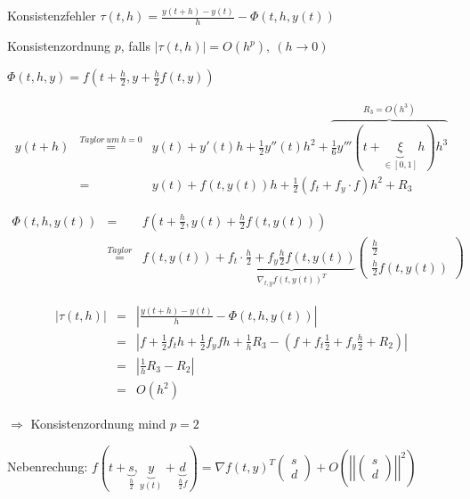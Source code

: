 \documentclass[10pt,a4paper]{article}
\begin{document}
Konsistenzfehler
$\tau(t,h)=\frac{y(t+h)-y(t)}{h} -\Phi(t,h,y(t))$

Konsistenzordnung $p$, falls
$|\tau(t,h)|=O(h^{p}), ~(h \rightarrow 0)$

\begin{bsp}
$\Phi(t,h,y)=f(t+\frac{h}{2},y+\frac{h}{2}f(t,y))$

\begin{eqnarray*}
y(t+h)&\stackrel{Taylor ~ um ~ h=0}{=}& y(t)+y'(t)h+\frac{1}{2}y''(t)h^{2}+\overbrace{\frac{1}{6}y'''(t + \underbrace{\xi}_{ \in [0,1]} h) h^{3}}^{R_3 = O(h^{3})} \\
&=& y(t)+f(t,y(t))h + \frac{1}{2}(f_t + f_y \cdot f)h^{2}+R_3
\end{eqnarray*}

\begin{eqnarray*}
\Phi(t,h,y(t))&=&f(t+\frac{h}{2},y(t)+\frac{h}{2}f(t,y(t))) \\
&\stackrel{Taylor}{=}& f(t,y(t))+ \underbrace{f_t \cdot \frac{h}{2} + f_y \frac{h}{2}f(t,y(t))}_{\nabla_{t,y}f(t,y(t))^{T}}
\begin{pmatrix}
\frac{h}{2} \\
\frac{h}{2} f(t,y(t))
\end{pmatrix}
\end{eqnarray*}

\begin{eqnarray*}
|\tau(t,h)|&=&\left| \frac{y(t+h)-y(t)}{h} - \Phi(t,h,y(t))\right|\\
& =& \left| f+\frac{1}{2}f_t h + \frac{1}{2}f_y f h + \frac{1}{h}R_3 -\left( f + f_t \frac{1}{2}+f_y \frac{h}{2} + R_2 \right)\right| \\
&=& \left| \frac{1}{h}R_3 - R_2\right| \\
& =&  O(h^{2})
\end{eqnarray*}

$\Rightarrow$ Konsistenzordnung mind $p=2$

Nebenrechung:
$f(t+\underbrace{s}_{\frac{h}{2}},\underbrace{y}_{y(t)}+\underbrace{d}_{\frac{h}{2} f}) = \nabla f(t,y)^{T} \begin{pmatrix}
s \\ d
\end{pmatrix} + O \left( \left|\left| \begin{pmatrix}
s \\ d
\end{pmatrix} \right|\right|^{2} \right)
$
\end{bsp}
\end{document}
